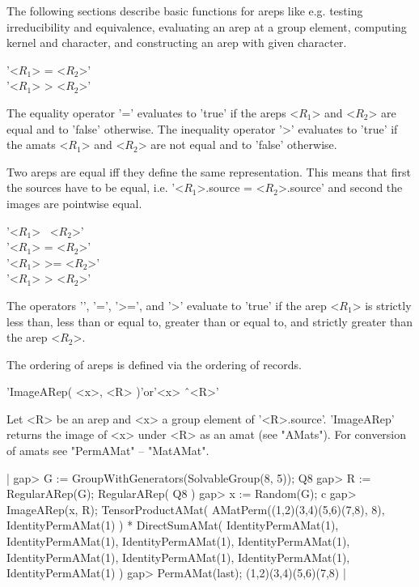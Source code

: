 
The following sections describe basic functions for areps like e.g.
testing irreducibility and equivalence, evaluating an arep at a
group element, computing kernel and character, and constructing an arep
with given character.
%

'<$R_1$> = <$R_2$>' \\
'<$R_1$> \<> <$R_2$>'

The equality operator '=' evaluates to 'true'  if the areps <$R_1$>
and <$R_2$> are equal and  to 'false' otherwise. The  inequality operator
'\<>' evaluates to 'true' if the amats <$R_1$> and <$R_2$> are not equal
and to 'false' otherwise.

Two areps are equal iff they define the same representation. 
This means that first the sources have to be equal, i.e. 
'<$R_1$>.source = <$R_2$>.source' and second the images are 
pointwise equal.

\bigskip
'<$R_1$> \<\ <$R_2$>' \\
'<$R_1$> \<= <$R_2$>' \\
'<$R_1$> >= <$R_2$>' \\
'<$R_1$> > <$R_2$>'

The operators '\<', '\<=', '>=', and '>' evaluate to 'true' if the 
arep <$R_1$> is strictly less than, less than or equal to, greater than or
equal to, and strictly greater than the arep <$R_2$>. 

The ordering of areps is defined via the ordering of records.


'ImageARep( <x>, <R> )'\quad or\quad'<x> \^\ <R>'

Let <R> be an arep and <x> a group element of '<R>.source'.
'ImageARep' returns the image of <x> under <R> as an amat 
(see "AMats"). For conversion of amats see "PermAMat" -- "MatAMat".

|    gap> G := GroupWithGenerators(SolvableGroup(8, 5));
    Q8
    gap> R := RegularARep(G);
    RegularARep( Q8 )
    gap> x := Random(G);
    c
    gap> ImageARep(x, R);
    TensorProductAMat(
      AMatPerm((1,2)(3,4)(5,6)(7,8), 8),
      IdentityPermAMat(1)
    ) *
    DirectSumAMat(
      IdentityPermAMat(1),
      IdentityPermAMat(1),
      IdentityPermAMat(1),
      IdentityPermAMat(1),
      IdentityPermAMat(1),
      IdentityPermAMat(1),
      IdentityPermAMat(1),
      IdentityPermAMat(1)
    )
    gap> PermAMat(last);
    (1,2)(3,4)(5,6)(7,8) |

